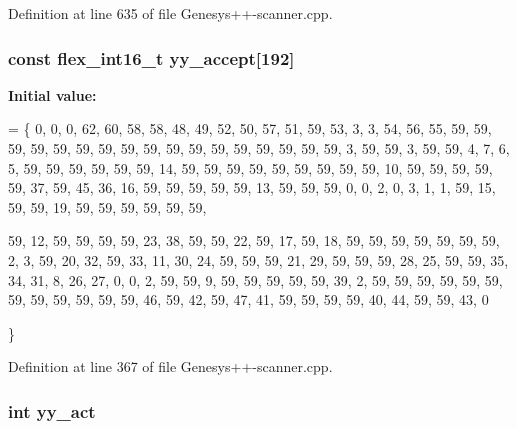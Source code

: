 Definition at line 635 of file Genesys++-\/scanner.\-cpp.

\hypertarget{_genesys_09_09-scanner_8cpp_a04feddd2bf03bd0c4a38caa913d40dfe}{
\subsubsection[{yy\-\_\-accept}]{\setlength{\rightskip}{0pt plus 5cm}const {\bf flex\-\_\-int16\-\_\-t} yy\-\_\-accept\mbox{[}192\mbox{]}\hspace{0.3cm}{\ttfamily [static]}}}\label{_genesys_09_09-scanner_8cpp_a04feddd2bf03bd0c4a38caa913d40dfe}
{\bfseries Initial value\-:}
\begin{DoxyCode}
=
    \{   0,
        0,    0,   62,   60,   58,   58,   48,   49,   52,   50,
       57,   51,   59,   53,    3,    3,   54,   56,   55,   59,
       59,   59,   59,   59,   59,   59,   59,   59,   59,   59,
       59,   59,   59,   59,   59,   59,    3,   59,   59,    3,
       59,   59,    4,    7,    6,    5,   59,   59,   59,   59,
       59,   59,   14,   59,   59,   59,   59,   59,   59,   59,
       59,   59,   10,   59,   59,   59,   59,   59,   37,   59,
       45,   36,   16,   59,   59,   59,   59,   59,   13,   59,
       59,   59,    0,    0,    2,    0,    3,    1,    1,   59,
       15,   59,   59,   19,   59,   59,   59,   59,   59,   59,

       59,   12,   59,   59,   59,   59,   23,   38,   59,   59,
       22,   59,   17,   59,   18,   59,   59,   59,   59,   59,
       59,   59,    2,    3,   59,   20,   32,   59,   33,   11,
       30,   24,   59,   59,   59,   21,   29,   59,   59,   59,
       28,   25,   59,   59,   35,   34,   31,    8,   26,   27,
        0,    0,    2,   59,   59,    9,   59,   59,   59,   59,
       59,   39,    2,   59,   59,   59,   59,   59,   59,   59,
       59,   59,   59,   59,   59,   46,   59,   42,   59,   47,
       41,   59,   59,   59,   59,   40,   44,   59,   59,   43,
        0

    \}
\end{DoxyCode}


Definition at line 367 of file Genesys++-\/scanner.\-cpp.

\hypertarget{_genesys_09_09-scanner_8cpp_a483da4c691e92dcb79c40a3514759b6b}{
\subsubsection[{yy\-\_\-act}]{\setlength{\rightskip}{0pt plus 5cm}int yy\-\_\-act}}\label{_genesys_09_09-scanner_8cpp_a483da4c691e92dcb79c40a3514759b6b}


